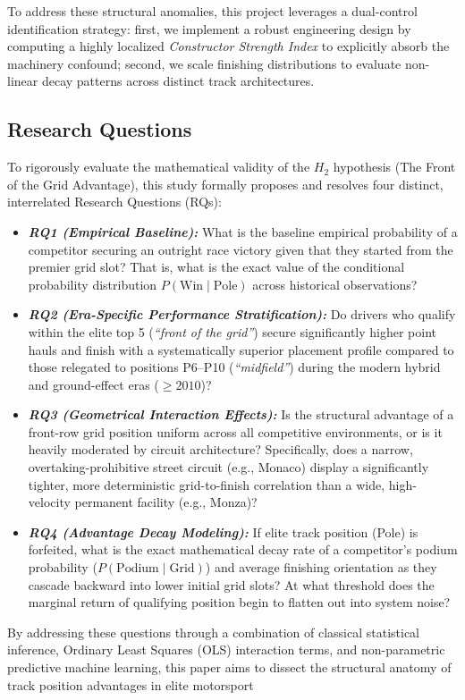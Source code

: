 \noindent To address these structural anomalies, this project leverages a dual-control identification strategy: first, we implement a robust engineering design by computing a highly localized \textit{Constructor Strength Index} to explicitly absorb the machinery confound; second, we scale finishing distributions to evaluate non-linear decay patterns across distinct track architectures. 

\subsection{Research Questions}
\label{subsec:research_questions}

To rigorously evaluate the mathematical validity of the $H_2$ hypothesis (The Front of the Grid Advantage), this study formally proposes and resolves four distinct, interrelated Research Questions (RQs):

\begin{itemize}
    \item \textbf{\textit{RQ1 (Empirical Baseline):}} What is the baseline empirical probability of a competitor securing an outright race victory given that they started from the premier grid slot? That is, what is the exact value of the conditional probability distribution $P(\text{Win} \mid \text{Pole})$ across historical observations?
    \item \textbf{\textit{RQ2 (Era-Specific Performance Stratification):}} Do drivers who qualify within the elite top 5 (\textit{``front of the grid''}) secure significantly higher point hauls and finish with a systematically superior placement profile compared to those relegated to positions P6--P10 (\textit{``midfield''}) during the modern hybrid and ground-effect eras ($\ge 2010$)? 
    \item \textbf{\textit{RQ3 (Geometrical Interaction Effects):}} Is the structural advantage of a front-row grid position uniform across all competitive environments, or is it heavily moderated by circuit architecture? Specifically, does a narrow, overtaking-prohibitive street circuit (e.g., Monaco) display a significantly tighter, more deterministic grid-to-finish correlation than a wide, high-velocity permanent facility (e.g., Monza)?
    \item \textbf{\textit{RQ4 (Advantage Decay Modeling):}} If elite track position (Pole) is forfeited, what is the exact mathematical decay rate of a competitor's podium probability ($P(\text{Podium} \mid \text{Grid})$) and average finishing orientation as they cascade backward into lower initial grid slots? At what threshold does the marginal return of qualifying position begin to flatten out into system noise?
\end{itemize}

\noindent By addressing these questions through a combination of classical statistical inference, Ordinary Least Squares (OLS) interaction terms, and non-parametric predictive machine learning, this paper aims to dissect the structural anatomy of track position advantages in elite motorsport